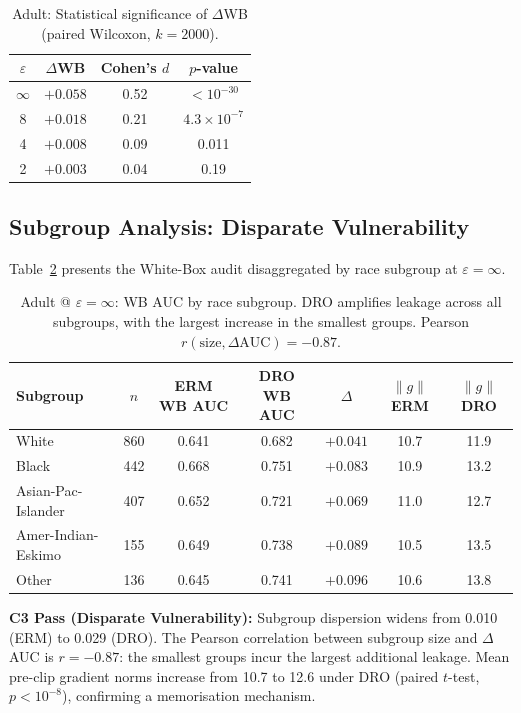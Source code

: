 \documentclass[11pt, a4paper]{article}
\begin{document}
\begin{table}[ht]
\centering
\caption{Adult: Statistical significance of $\Delta$WB (paired Wilcoxon, $k=2000$).}
\label{tab:adult_sig}
\small
\begin{tabular}{@{}c c c c@{}}
\toprule
$\varepsilon$ & $\Delta$WB & Cohen's $d$ & $p$-value \\
\midrule
$\infty$ & $+0.058$ & 0.52 & $< 10^{-30}$ \\
8 & $+0.018$ & 0.21 & $4.3 \times 10^{-7}$ \\
4 & $+0.008$ & 0.09 & 0.011 \\
2 & $+0.003$ & 0.04 & 0.19 \\
\bottomrule
\end{tabular}
\end{table}

\subsection{Subgroup Analysis: Disparate Vulnerability}

Table~\ref{tab:subgroup} presents the White-Box audit disaggregated by race subgroup at $\varepsilon = \infty$.

\begin{table}[ht]
\centering
\caption{Adult @ $\varepsilon=\infty$: WB AUC by race subgroup. DRO amplifies leakage across all subgroups, with the largest increase in the smallest groups. Pearson $r(\text{size}, \Delta\text{AUC}) = -0.87$.}
\label{tab:subgroup}
\small
\begin{tabular}{@{}l c c c c c c@{}}
\toprule
Subgroup & $n$ & ERM WB AUC & DRO WB AUC & $\Delta$ & $\|g\|$ ERM & $\|g\|$ DRO \\
\midrule
White & 860 & 0.641 & 0.682 & $+0.041$ & 10.7 & 11.9 \\
Black & 442 & 0.668 & 0.751 & $+0.083$ & 10.9 & 13.2 \\
Asian-Pac-Islander & 407 & 0.652 & 0.721 & $+0.069$ & 11.0 & 12.7 \\
Amer-Indian-Eskimo & 155 & 0.649 & 0.738 & $+0.089$ & 10.5 & 13.5 \\
Other & 136 & 0.645 & 0.741 & $\mathbf{+0.096}$ & 10.6 & 13.8 \\
\bottomrule
\end{tabular}
\end{table}

\textbf{C3 Pass (Disparate Vulnerability):} Subgroup dispersion widens from 0.010 (ERM) to 0.029 (DRO). The Pearson correlation between subgroup size and $\Delta$AUC is $r = -0.87$: the smallest groups incur the largest additional leakage. Mean pre-clip gradient norms increase from 10.7 to 12.6 under DRO (paired $t$-test, $p < 10^{-8}$), confirming a memorisation mechanism.
\end{document}
